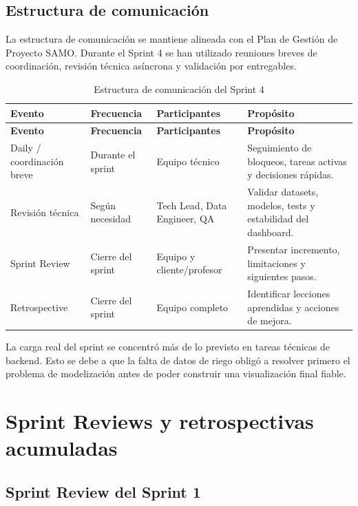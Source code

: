 \documentclass[11pt,a4paper]{article}
\begin{document}
\subsection{Estructura de comunicación}

La estructura de comunicación se mantiene alineada con el Plan de Gestión de Proyecto SAMO. Durante el Sprint 4 se han utilizado reuniones breves de coordinación, revisión técnica asíncrona y validación por entregables.

\begin{longtable}{p{}p{}p{}p{}}
\caption{Estructura de comunicación del Sprint 4}\\
\toprule
\textbf{Evento} & \textbf{Frecuencia} & \textbf{Participantes} & \textbf{Propósito} \\
\midrule
\endfirsthead
\toprule
\textbf{Evento} & \textbf{Frecuencia} & \textbf{Participantes} & \textbf{Propósito} \\
\midrule
\endhead
Daily / coordinación breve & Durante el sprint & Equipo técnico & Seguimiento de bloqueos, tareas activas y decisiones rápidas. \\
Revisión técnica & Según necesidad & Tech Lead, Data Engineer, QA & Validar datasets, modelos, tests y estabilidad del dashboard. \\
Sprint Review & Cierre del sprint & Equipo y cliente/profesor & Presentar incremento, limitaciones y siguientes pasos. \\
Retrospective & Cierre del sprint & Equipo completo & Identificar lecciones aprendidas y acciones de mejora. \\
\bottomrule
\end{longtable}

La carga real del sprint se concentró más de lo previsto en tareas técnicas de backend. Esto se debe a que la falta de datos de riego obligó a resolver primero el problema de modelización antes de poder construir una visualización final fiable.

\newpage

\section{Sprint Reviews y retrospectivas acumuladas}

\subsection{Sprint Review del Sprint 1}
\end{document}
